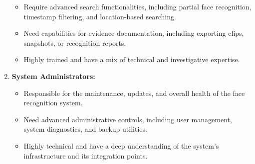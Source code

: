 \begin{enumerate}
\begin{itemize}
                    \item Require advanced search functionalities, including partial face recognition, timestamp filtering, and location-based searching.
                    \item Need capabilities for evidence documentation, including exporting clips, snapshots, or recognition reports.
                    \item Highly trained and have a mix of technical and investigative expertise. 
                \end{itemize}
            \item \textbf{System Administrators:}
                \begin{itemize}
                    \item Responsible for the maintenance, updates, and overall health of the face recognition system.
                    \item Need advanced administrative controls, including user management, system diagnostics, and backup utilities.
                    \item Highly technical and have a deep understanding of the system's infrastructure and its integration points.   
                \end{itemize}
            
        \end{enumerate}
    
